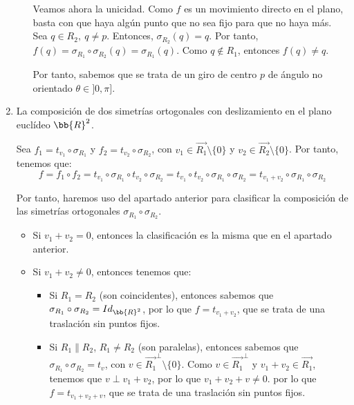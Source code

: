 \begin{ejercicio}
\begin{enumerate}
\begin{itemize}
            Veamos ahora la unicidad. Como $f$ es un movimiento directo en el plano, basta con que haya algún punto que no sea fijo para que no haya más.
            Sea $q\in R_2,~q\neq p$. Entonces, $\sigma_{R_2}(q)=q$. Por tanto, $f(q)=\sigma_{R_1} \circ \sigma_{R_2}(q) = \sigma_{R_1}(q)$. Como $q\notin R_1$, entonces $f(q)\neq q$.

            Por tanto, sabemos que se trata de un giro de centro $p$ de ángulo no orientado $\theta \in ]0, \pi]$.
        \end{itemize}


        \item La composición de dos simetrías ortogonales con deslizamiento en el plano euclídeo $\bb{R}^2$.
        
        Sea $f_1 = t_{v_1} \circ \sigma_{R_1}$ y $f_2 = t_{v_2} \circ \sigma_{R_2}$, con $v_1\in \vec{R_1}\setminus \{0\}$ y $v_2\in \vec{R_2}\setminus \{0\}$.
        Por tanto, tenemos que:
        \begin{equation*}
            f = f_1 \circ f_2 = t_{v_1} \circ \sigma_{R_1} \circ t_{v_2} \circ \sigma_{R_2} = t_{v_1} \circ t_{v_2} \circ \sigma_{R_1} \circ \sigma_{R_2}
            = t_{v_1+v_2} \circ \sigma_{R_1} \circ \sigma_{R_2}
        \end{equation*}

        Por tanto, haremos uso del apartado anterior para clasificar la composición de las simetrías ortogonales $\sigma_{R_1} \circ \sigma_{R_2}$.
        \begin{itemize}
            \item Si $v_1+v_2 = 0$, entonces la clasificación es la misma que en el apartado anterior.
            \item Si $v_1+v_2 \neq 0$, entonces tenemos que:
            \begin{itemize}
                \item Si $R_1=R_2$ (son coincidentes), entonces sabemos que $\sigma_{R_1} \circ \sigma_{R_2}= Id_{\bb{R}^2}$,
                por lo que $f=t_{v_1+v_2}$, que se trata de una traslación sin puntos fijos.
                
                \item Si $R_1 \| R_2$, $R_1 \neq R_2$ (son paralelas),
                entonces sabemos que $\sigma_{R_1} \circ \sigma_{R_2}=t_v$, con $v\in \vec{R_1}^\perp \setminus \{0\}$.
                Como $v\in \vec{R_1}^\perp$ y $v_1+v_2 \in \vec{R_1}$, tenemos que $v\perp v_1+v_2$, por lo que $v_1+v_2+v \neq 0$.
                por lo que $f=t_{v_1+v_2+v}$, que se trata de una traslación sin puntos fijos.
                

\end{itemize}
\end{itemize}
\end{enumerate}
\end{ejercicio}
